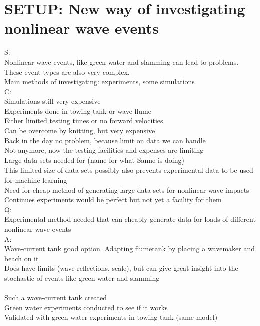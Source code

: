 \chapter{SETUP: New way of investigating nonlinear wave events}
S: \\
Nonlinear wave events, like green water and slamming can lead to problems. \\
These event types are also very complex. \\
Main methods of investigating: experiments, some simulations \\
C: \\
Simulations still very expensive \\
Experiments done in towing tank or wave flume \\
Either limited testing times or no forward velocities \\
Can be overcome by knitting, but very expensive \\
Back in the day no problem, because limit on data we can handle \\
Not anymore, now the testing facilities and expenses are limiting \\
Large data sets needed for (name for what Sanne is doing)\\
This limited size of data sets possibly also prevents experimental data to be used for machine learning \\
Need for cheap method of generating large data sets for nonlinear wave impacts \\
Continues experiments would be perfect but not yet a facility for them\\
Q:\\
Experimental method needed that can cheaply generate data for loads of different nonlinear wave events \\
A:\\
Wave-current tank good option. Adapting flumetank by placing a wavemaker and beach on it\\
Does have limits (wave reflections, scale), but can give great insight into the stochastic of events like green water and slamming \\
\\


Such a wave-current tank created \\
Green water experiments conducted to see if it works \\
Validated with green water experiments in towing tank (same model) \\


